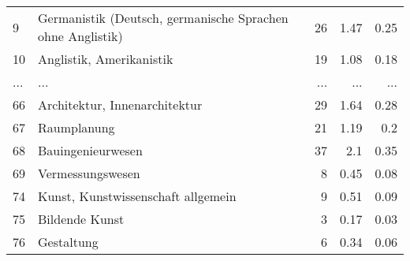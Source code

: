 \begin{longtable}{lXrrr}
        9 & \multicolumn{1}{X}{Germanistik (Deutsch, germanische Sprachen ohne Anglistik)} & %
          \num{26} &
          \num[round-mode=places,round-precision=2]{1,47} &
          \num[round-mode=places,round-precision=2]{0,25} \\
        10 & \multicolumn{1}{X}{Anglistik, Amerikanistik} & %
          \num{19} &
          \num[round-mode=places,round-precision=2]{1,08} &
          \num[round-mode=places,round-precision=2]{0,18} \\
       ... & ... & ... & ... & ... \\
        66 & \multicolumn{1}{X}{Architektur, Innenarchitektur} & %
          \num{29} &
          \num[round-mode=places,round-precision=2]{1,64} &
          \num[round-mode=places,round-precision=2]{0,28} \\

        67 & \multicolumn{1}{X}{Raumplanung} & %
          \num{21} &
          \num[round-mode=places,round-precision=2]{1,19} &
          \num[round-mode=places,round-precision=2]{0,2} \\

        68 & \multicolumn{1}{X}{Bauingenieurwesen} & %
          \num{37} &
          \num[round-mode=places,round-precision=2]{2,1} &
          \num[round-mode=places,round-precision=2]{0,35} \\

        69 & \multicolumn{1}{X}{Vermessungswesen} & %
          \num{8} &
          \num[round-mode=places,round-precision=2]{0,45} &
          \num[round-mode=places,round-precision=2]{0,08} \\

        74 & \multicolumn{1}{X}{Kunst, Kunstwissenschaft allgemein} & %
          \num{9} &
          \num[round-mode=places,round-precision=2]{0,51} &
          \num[round-mode=places,round-precision=2]{0,09} \\

        75 & \multicolumn{1}{X}{Bildende Kunst} & %
          \num{3} &
          \num[round-mode=places,round-precision=2]{0,17} &
          \num[round-mode=places,round-precision=2]{0,03} \\

        76 & \multicolumn{1}{X}{Gestaltung} & %
          \num{6} &
          \num[round-mode=places,round-precision=2]{0,34} &
          \num[round-mode=places,round-precision=2]{0,06} \\


\end{longtable}
